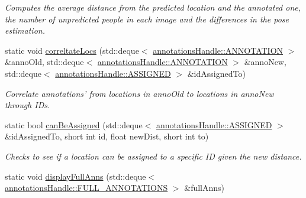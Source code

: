 \begin{DoxyCompactItemize}
\begin{DoxyCompactList}\small\item\em Computes the average distance from the predicted location and the annotated one, the number of unpredicted people in each image and the differences in the pose estimation. \item\end{DoxyCompactList}\item 
\hypertarget{classannotationsHandle_a0bae26ba86ff9a58103991ce133dc0a7}{
static void \hyperlink{classannotationsHandle_a0bae26ba86ff9a58103991ce133dc0a7}{correltateLocs} (std::deque$<$ \hyperlink{structannotationsHandle_1_1ANNOTATION}{annotationsHandle::ANNOTATION} $>$ \&annoOld, std::deque$<$ \hyperlink{structannotationsHandle_1_1ANNOTATION}{annotationsHandle::ANNOTATION} $>$ \&annoNew, std::deque$<$ \hyperlink{structannotationsHandle_1_1ASSIGNED}{annotationsHandle::ASSIGNED} $>$ \&idAssignedTo)}
\label{classannotationsHandle_a0bae26ba86ff9a58103991ce133dc0a7}

\begin{DoxyCompactList}\small\item\em Correlate annotations' from locations in {\ttfamily annoOld} to locations in {\ttfamily annoNew} through IDs. \item\end{DoxyCompactList}\item 
\hypertarget{classannotationsHandle_abc6aef3247cf6e027e012bc711f185a5}{
static bool \hyperlink{classannotationsHandle_abc6aef3247cf6e027e012bc711f185a5}{canBeAssigned} (std::deque$<$ \hyperlink{structannotationsHandle_1_1ASSIGNED}{annotationsHandle::ASSIGNED} $>$ \&idAssignedTo, short int id, float newDist, short int to)}
\label{classannotationsHandle_abc6aef3247cf6e027e012bc711f185a5}

\begin{DoxyCompactList}\small\item\em Checks to see if a location can be assigned to a specific ID given the new distance. \item\end{DoxyCompactList}\item 
\hypertarget{classannotationsHandle_a877313da90e173b191811aedbc91cac3}{
static void \hyperlink{classannotationsHandle_a877313da90e173b191811aedbc91cac3}{displayFullAnns} (std::deque$<$ \hyperlink{structannotationsHandle_1_1FULL__ANNOTATIONS}{annotationsHandle::FULL\_\-ANNOTATIONS} $>$ \&fullAnns)}
\label{classannotationsHandle_a877313da90e173b191811aedbc91cac3}


\end{DoxyCompactItemize}
